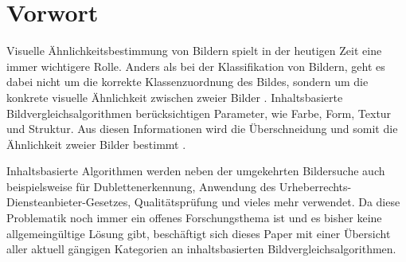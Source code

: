 \section{Vorwort}\label{einleitung}
Visuelle Ähnlichkeitsbestimmung von Bildern spielt in der heutigen Zeit eine
immer wichtigere Rolle. Anders als bei der Klassifikation von Bildern, geht es
dabei nicht um die korrekte Klassenzuordnung des Bildes, sondern um die konkrete 
visuelle Ähnlichkeit zwischen zweier Bilder \parencite{intro-classification}. 
Inhaltsbasierte Bildvergleichsalgorithmen berücksichtigen Parameter, wie Farbe,
Form, Textur und Struktur. Aus diesen Informationen wird die Überschneidung und
somit die Ähnlichkeit zweier Bilder bestimmt \parencite{intro-cibr}.

Inhaltsbasierte Algorithmen werden neben der umgekehrten Bildersuche
auch beispielsweise für Dublettenerkennung, Anwendung des
Urheberrechts-Diensteanbieter-Gesetzes, Qualitätsprüfung und vieles mehr
verwendet. Da diese Problematik noch immer ein offenes Forschungsthema ist und
es bisher keine allgemeingültige Lösung gibt, beschäftigt sich dieses Paper mit
einer Übersicht aller aktuell gängigen Kategorien an inhaltsbasierten
Bildvergleichsalgorithmen.